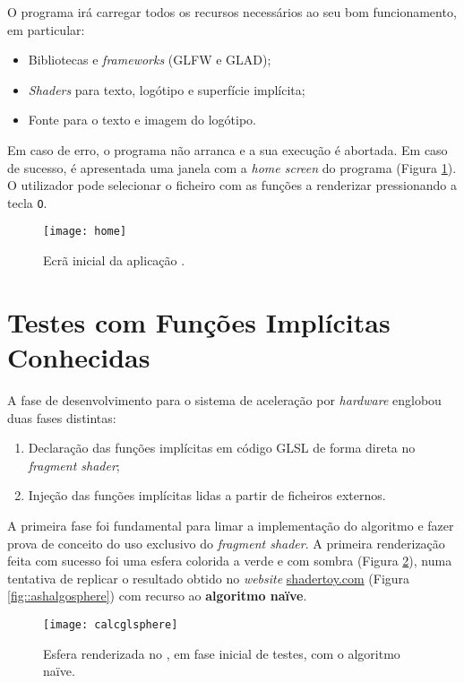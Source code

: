 O programa irá carregar todos os recursos necessários ao seu bom funcionamento, em particular:
\begin{itemize}
	\item Bibliotecas e \textit{frameworks} (GLFW e \acs{GLAD});
	\item \textit{Shaders} para texto, logótipo e superfície implícita;
	\item Fonte para o texto e imagem do logótipo.
\end{itemize}

Em caso de erro, o programa não arranca e a sua execução é abortada. Em caso de sucesso, é apresentada uma janela com a \textit{home screen} do programa (Figura \ref{fig::home}). O utilizador pode selecionar o ficheiro com as funções a renderizar pressionando a tecla \verb|O|.

\begin{figure}[!htbp]
	\centering
	\texttt{[image: home]}
	\caption[Ecrã inicial da aplicação]{Ecrã inicial da aplicação \theapp.}
	\label{fig::home}
\end{figure}


\section{Testes com Funções Implícitas Conhecidas}
\label{sec::testes:dev}

A fase de desenvolvimento para o sistema de aceleração por \textit{hardware} englobou duas fases distintas:
\begin{enumerate}
	\item Declaração das funções implícitas em código \acs{GLSL} de forma direta no \textit{fragment shader};
	\item Injeção das funções implícitas lidas a partir de ficheiros externos.
\end{enumerate}

A primeira fase foi fundamental para limar a implementação do algoritmo e fazer prova de conceito do uso exclusivo do \textit{fragment shader}. A primeira renderização feita com sucesso foi uma esfera colorida a verde e com sombra (Figura \ref{fig::calcglsphere}), numa tentativa de replicar o resultado obtido no \textit{website} \url{shadertoy.com} (Figura \ref{fig::ashalgosphere}) com recurso ao \textbf{algoritmo naïve}.

\begin{figure}[!htbp]
	\centering
	\texttt{[image: calcglsphere]}
	\caption[Esfera no \theapp~com algoritmo naïve]{Esfera renderizada no \theapp, em fase inicial de testes, com o algoritmo naïve.}
	\label{fig::calcglsphere}
\end{figure}

